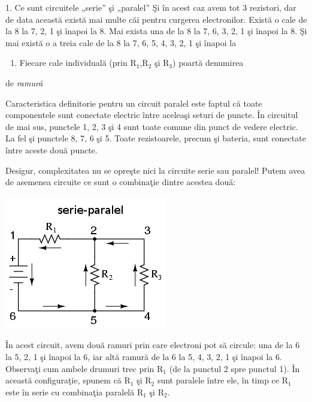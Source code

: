 \documentclass[presentation]{beamer}
\begin{document}
\begin{frame}[label=sec-1]{1. Ce sunt circuitele „serie” şi „paralel”}
Şi în acest caz avem tot 3 rezistori, dar de data această există mai
multe căi pentru curgerea electronilor. Există o cale de la 8 la 7, 2, 1
şi înapoi la 8. Mai exista una de la 8 la 7, 6, 3, 2, 1 şi înapoi la 8.
Şi mai există o a treia cale de la 8 la 7, 6, 5, 4, 3, 2, 1 şi înapoi la
\begin{enumerate}
\item Fiecare cale individuală (prin R$_{\text{1}}$,R$_{\text{2}}$ şi R$_{\text{3}}$) poartă denumirea
\end{enumerate}
de \emph{ramură}

Caracteristica definitorie pentru un circuit paralel este faptul că
toate componentele sunt conectate electric între aceleaşi seturi de
puncte. În circuitul de mai sus, punctele 1, 2, 3 şi 4 sunt toate comune
din punct de vedere electric. La fel şi punctele 8, 7, 6 şi 5. Toate
rezistoarele, precum şi bateria, sunt conectate între aceste două
puncte.

Desigur, complexitatea nu se opreşte nici la circuite serie sau paralel!
Putem avea de asemenea circuite ce sunt o combinaţie dintre acestea
două:

\includegraphics[width=.9\linewidth]{../poze/00084.png}

În acest circuit, avem două ramuri prin care electroni pot să circule:
una de la 6 la 5, 2, 1 şi înapoi la 6, iar altă ramură de la 6 la 5, 4,
3, 2, 1 şi înapoi la 6. Observaţi cum ambele drumuri trec prin R$_{\text{1}}$ (de
la punctul 2 spre punctul 1). În această configuraţie, spunem că R$_{\text{1}}$
şi R$_{\text{2}}$ sunt paralele între ele, în timp ce R$_{\text{1}}$ este în serie cu
combinaţia paralelă R$_{\text{1}}$ şi R$_{\text{2}}$.


\end{frame}
\end{document}
